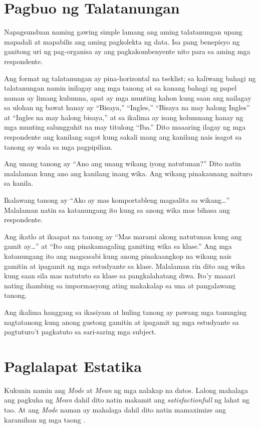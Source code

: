 \documentclass [british, 11pt] {report}
\begin{document}
\section{Pagbuo ng Talatanungan}
Napagsunduan naming gawing simple lamang ang aming talatanungan upang mapadali
at mapabilis ang aming pagkolekta ng data. Isa pang benepisyo ng ganitong uri ng
pag-organisa ay ang pagkakombenyente nito para sa aming mga respondente.

Ang format ng talatanungan ay pina-horizontal na tseklist; sa kaliwang bahagi ng
talatanungan namin inilagay ang mga tanong at sa kanang bahagi ng papel naman ay
limang kulumna, apat ay mga munting kahon kung saan ang nailagay sa ulohan ng
bawat hanay ay ``Bisaya,'' ``Ingles,'' ``Bisaya na may halong Ingles'' at
``Ingles na may halong bisaya,'' at sa ikalima ay isang kolumnang hanay ng mga
munting salungguhit na may titulong ``Iba.'' Dito maaaring ilagay ng mga
respondente ang kanilang sagot kung sakali mang ang kanilang nais isagot sa
tanong ay wala sa mga pagpipilian.

Ang unang tanong ay ``Ano ang unang wikang iyong natutunan?'' Dito natin
malalaman kung ano ang kanilang inang wika. Ang wikang pinakaunang naituro sa
kanila.
  
Ikalawang tanong ay ``Ako ay mas komportableng magsalita sa wikang\ldots''
Malalaman natin sa katanungang ito kung sa anong wika mas bihasa ang
respondente.

Ang ikatlo at ikaapat na tanong ay ``Mas marami akong natutunan kung ang gamit
ay\ldots'' at ``Ito ang pinakamagaling gamiting wika sa klase.'' Ang mga
katanungang ito ang magsasabi kung anong pinakaangkop na wikang nais gamitin at
ipagamit ng mga estudyante sa klase. Malalaman rin dito ang wika kung saan sila
mas natututo sa klase sa pangkalahatang diwa. Ito'y maaari nating ihambing sa
impormasyong ating makakalap sa una at pangalawang tanong.

Ang ikalima hanggang sa ikasiyam at huling tanong ay pawang mga tanunging
nagtatanong kung anong gustong gamitin at ipagamit ng mga estudyante sa
pagtuturo't pagkatuto sa sari-saring mga subject.
\section{Paglalapat Estatika}
Kukunin namin ang \emph{Mode} at \emph{Mean} ng mga nalakap na datos. Lalong
mahalaga ang pagkuha ng \emph{Mean} dahil dito natin makamit ang
\emph{\gls{satisfactionfull}} ng lahat ng tao. At ang \emph{Mode} naman ay mahalaga
dahil dito natin mamaximize ang karamihan ng mga taong
\emph{}.
\end{document}

